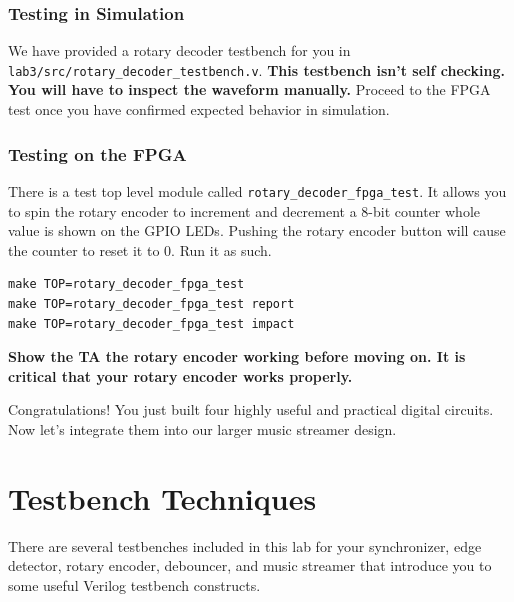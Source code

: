 \documentclass[11pt]{article}
\begin{document}
\subsubsection{Testing in Simulation}
We have provided a rotary decoder testbench for you in \verb|lab3/src/rotary_decoder_testbench.v|. \textbf{This testbench isn't self checking. You will have to inspect the waveform manually.} Proceed to the FPGA test once you have confirmed expected behavior in simulation.

\subsubsection{Testing on the FPGA}
There is a test top level module called \verb|rotary_decoder_fpga_test|. It allows you to spin the rotary encoder to increment and decrement a 8-bit counter whole value is shown on the GPIO LEDs. Pushing the rotary encoder button will cause the counter to reset it to 0. Run it as such.

\begin{verbatim}
make TOP=rotary_decoder_fpga_test
make TOP=rotary_decoder_fpga_test report
make TOP=rotary_decoder_fpga_test impact
\end{verbatim} 

\textbf{Show the TA the rotary encoder working before moving on. It is critical that your rotary encoder works properly.}

Congratulations! You just built four highly useful and practical digital circuits. Now let's integrate them into our larger music streamer design.

\section{Testbench Techniques}
There are several testbenches included in this lab for your synchronizer, edge detector, rotary encoder, debouncer, and music streamer that introduce you to some useful Verilog testbench constructs.
\end{document}
